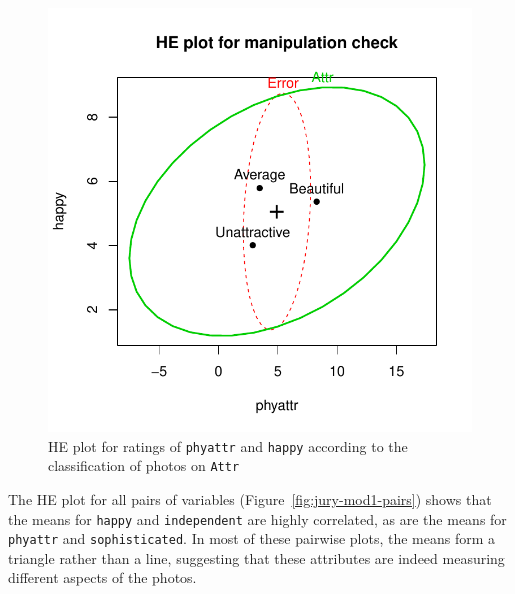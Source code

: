 \documentclass[11pt]{article}
\newcommand{\figref}[1]{Figure~\ref{#1}}
\newcommand{\code}[1]{{\texttt{#1}}}
\begin{document}
\begin{figure}[htb]
\begin{center}
	\includegraphics{fig/plot-jury-mod1-HE}
\caption{HE plot for ratings of \code{phyattr} and \code{happy} according to the
	classification of photos on \code{Attr}}
\label{fig:jury-mod1-HE}
\end{center}
\end{figure}

The HE plot for all pairs of variables (\figref{fig:jury-mod1-pairs}) shows that the means for \code{happy}
and \code{independent} are highly correlated, as are the means for \code{phyattr}
and \code{sophisticated}.  In most of these pairwise plots, the means form a
triangle rather than a line, suggesting that these attributes are indeed
measuring different aspects of the photos.
\end{document}

